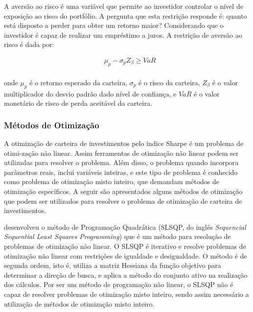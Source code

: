                     \ipar A aversão ao risco é uma variável que permite ao investidor controlar o nível de exposição ao risco do portfólio. A pergunta que esta restrição responde é: quanto está disposto a perder para obter um retorno maior? Considerando que o investidor é capaz de realizar um empréstimo a juros. A restrição de aversão ao risco é dada por:
                    
                    \begin{equation}
                        \begin{aligned}
                            & \mu_{p} - \sigma_{p} Z_\beta \geq VaR \\
                        \end{aligned}
                    \end{equation}

                    \noindent onde $\mu_{p}$ é o retorno esperado da carteira, $\sigma_{p}$ é o risco da carteira, $Z_\beta$ é o valor multiplicador do desvio padrão dado nível de confiança, e $VaR$ é o valor monetário de risco de perda aceitável da carteira.

            \subsubsection{Métodos de Otimização}

                \ipar A otimização de carteira de investimentos pelo índice Sharpe é um problema de otimi-zação não linear. Assim ferramentas de otimização não linear podem ser utilizadas para resolver o problema. Além disso, o problema quando incorpora parâmetros reais, inclui variáveis inteiras, e este tipo de problema é conhecido como problema de otimização misto inteiro, que demandam métodos de otimização específicos. A seguir são apresentados alguns métodos de otimização que podem ser utilizados para resolver o problema de otimização de carteira de investimentos.

                \ipar {} desenvolveu o método de Programação Quadrática (\acrshort{SLSQP}, do inglês \textit{Sequencial Sequential Least Squares Programming}) que é um método para resolução de problemas de otimização não linear. O \acrshort{SLSQP} é iterativo e resolve problemas de otimização não linear com restrições de igualdade e desigualdade. O método é de segunda ordem, isto é, utiliza a matriz Hessiana da função objetivo para determinar a direção de busca, e aplica a método do conjunto ativo na realização dos cálculos. Por ser um método de programação não linear, o \acrshort{SLSQP} não é capaz de resolver problemas de otimização misto inteiro, sendo assim necessário a utilização de métodos de otimização misto inteiro.

